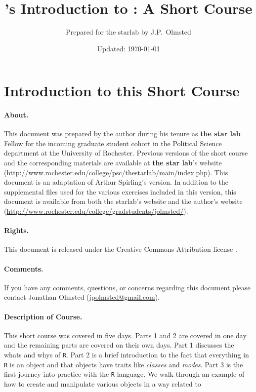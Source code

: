 \documentclass[10pt,letterpaper]{article}
\author{Prepared for the starlab by J.P.\ Olmsted}
\title{\tsl{}'s Introduction to \R: A Short Course}
\date{Updated: \today}
\newcommand\R[0]{\texttt{R}}
\newcommand\tsl[0]{\textbf{the star lab}}
\begin{document}
\begin{titlepage}
\maketitle 
\tableofcontents
\end{titlepage}

\section*{Introduction to this Short Course}

\paragraph{About.}This document was prepared by the author during his
tenure as \tsl{} Fellow for the incoming graduate student cohort in
the Political Science department at the University of
Rochester. Previous versions of the short course and the corresponding
materials are available at \tsl{}'s website
(\url{http://www.rochester.edu/college/psc/thestarlab/main/index.php}). This
document is an adaptation of Arthur Spirling's version. In addition to
the supplemental files used for the various exercises included in this
version, this document is available from both the starlab's website
and the author's website
(\url{http://www.rochester.edu/college/gradstudents/jolmsted/}).

\paragraph{Rights.}This document is released under the Creative
Commons Attribution license \by.

\paragraph{Comments.}If you have any comments, questions, or concerns
regarding this document please contact Jonathan Olmsted
(\url{jpolmsted@gmail.com}).

\paragraph{Description of Course.} This short course was covered in
five days. Parts 1 and 2 are covered in one day and the remaining
parts are covered on their own days. Part 1 discusses the whats and
whys of \R{}. Part 2 is a brief introduction to the fact that
everything in \R{} is an object and that objects have traits like
\textit{classes} and \textit{modes}. Part 3 is the first journey into
practice with the \R{} language. We walk through an example of how to
create and manipulate various objects in a way related to 
\end{document}
